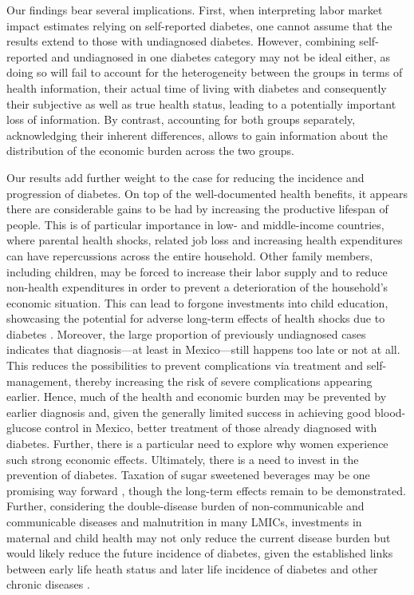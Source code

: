 \documentclass[12pt,english]{article}
\begin{document}
Our findings bear several implications. First, when interpreting labor market impact estimates relying on self-reported diabetes, one cannot assume that the results extend to those with undiagnosed diabetes. However, combining self-reported and undiagnosed in one diabetes category may not be ideal either, as doing so will fail to account for the heterogeneity between the groups in terms of health information, their actual time of living with diabetes and consequently their subjective as well as true health status, leading to a potentially important loss of information. By contrast, accounting for both groups separately, acknowledging their inherent differences, allows to gain information about the distribution of the economic burden across the two groups.

Our results add further weight to the case for reducing the incidence and progression of diabetes. On top of the well-documented health benefits, it appears there are considerable gains to be had by increasing the productive lifespan of people. This is of particular
importance in low- and middle-income countries, where parental health shocks, related job loss and increasing health expenditures can have repercussions across the entire household. Other family members, including children, may be forced to increase their labor supply and
to reduce non-health expenditures in order to prevent a deterioration of the household's economic situation. This can lead to forgone investments into child education, showcasing the potential for adverse long-term effects of health shocks due to diabetes \parencite{Bratti2014}. Moreover, the large proportion of previously undiagnosed cases indicates that diagnosis---at least in Mexico---still happens too late or not at all. This reduces the possibilities to prevent complications via treatment and self-management, thereby increasing the risk of severe complications appearing earlier. Hence, much of the health and economic burden may be prevented by earlier diagnosis and, given the generally limited success in achieving good blood-glucose control in Mexico, better treatment of those already diagnosed with diabetes. Further, there is a particular need to explore why women experience such strong economic effects. Ultimately, there is a need to invest in the prevention of diabetes. Taxation of sugar sweetened beverages may be one promising way forward \parencite{Colchero2016}, though the long-term effects remain to be demonstrated. Further, considering the double-disease burden of non-communicable and communicable diseases and malnutrition in many \acl{LMICs}, investments in maternal and child health may not only reduce the current disease burden but would likely reduce the future incidence of diabetes, given the established links between early life heath status and later life incidence of diabetes and other chronic diseases \parencite{Sotomayor2013,Hanson2012,Li2010b}.  
\end{document}
